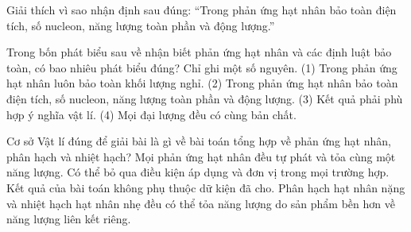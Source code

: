 \begin{bt}
Giải thích vì sao nhận định sau đúng: “Trong phản ứng hạt nhân bảo toàn điện tích, số nucleon, năng lượng toàn phần và động lượng.”
\end{bt}

\begin{ex}
Trong bốn phát biểu sau về nhận biết phản ứng hạt nhân và các định luật bảo toàn, có bao nhiêu phát biểu đúng? Chỉ ghi một số nguyên. (1) Trong phản ứng hạt nhân luôn bảo toàn khối lượng nghỉ. (2) Trong phản ứng hạt nhân bảo toàn điện tích, số nucleon, năng lượng toàn phần và động lượng. (3) Kết quả phải phù hợp ý nghĩa vật lí. (4) Mọi đại lượng đều có cùng bản chất.
\end{ex}

\begin{ex}
Cơ sở Vật lí đúng để giải bài là gì về bài toán tổng hợp về phản ứng hạt nhân, phân hạch và nhiệt hạch?
\choice
{Mọi phản ứng hạt nhân đều tự phát và tỏa cùng một năng lượng.}
{Có thể bỏ qua điều kiện áp dụng và đơn vị trong mọi trường hợp.}
{Kết quả của bài toán không phụ thuộc dữ kiện đã cho.}
{\True Phân hạch hạt nhân nặng và nhiệt hạch hạt nhân nhẹ đều có thể tỏa năng lượng do sản phẩm bền hơn về năng lượng liên kết riêng.}
\end{ex}

